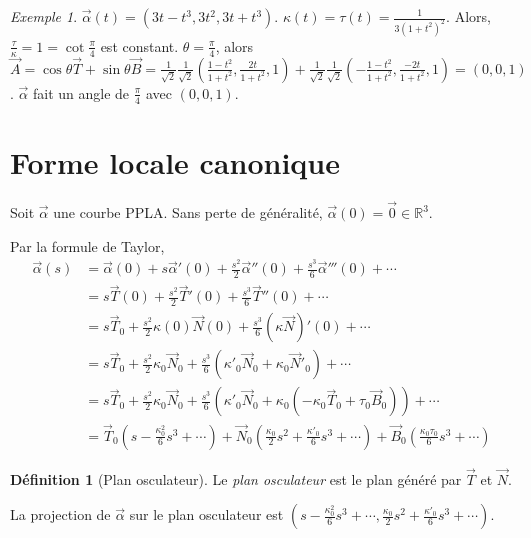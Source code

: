 \documentclass{report}
\theoremstyle{definition}
\newtheorem*{dfn}{D\'efinition}
\theoremstyle{remark}
\newtheorem*{exem}{Exemple}
\def\RR{\mathbb{R}}
\begin{document}
	\begin{exem}
		$\vec\alpha(t) = \left( 3t-t^3, 3t^2, 3t+t^3 \right)$. $\kappa(t) = \tau(t) = \frac{1}{3(1+t^2)^2}$. Alors, $\frac{\tau}{\kappa} = 1 = \cot\frac{\pi}{4}$ est constant. $\theta=\frac{\pi}{4}$, alors $\vec A=\cos\theta\vec T+\sin\theta\vec B = \frac{1}{\sqrt{2}} \frac{1}{\sqrt{2}}\left( \frac{1-t^2}{1+t^2}, \frac{2t}{1+t^2}, 1 \right) + \frac{1}{\sqrt{2}} \frac{1}{\sqrt{2}} \left( -\frac{1-t^2}{1+t^2}, \frac{-2t}{1+t^2}, 1 \right) = (0,0,1)$. $\vec\alpha$ fait un angle de $\frac{\pi}{4}$ avec $(0,0,1)$.
	\end{exem}

	\section{Forme locale canonique}
	Soit $\vec\alpha$ une courbe PPLA. Sans perte de g\'en\'eralit\'e, $\vec\alpha(0)=\vec0\in\RR^3$.

	Par la formule de Taylor,
	\begin{align*}
		\vec\alpha(s)&= \vec\alpha(0) + s\vec\alpha'(0) + \frac{s^2}{2}\vec\alpha''(0) + \frac{s^3}{6}\vec\alpha'''(0) + \cdots\\
		&= s\vec T(0) + \frac{s^2}{2}\vec T'(0) + \frac{s^3}{6}\vec T''(0) + \cdots\\
		&= s\vec T_0 + \frac{s^2}{2}\kappa(0)\vec N(0) + \frac{s^3}{6} \left(\kappa\vec N \right)'(0) + \cdots\\
		&= s\vec T_0 + \frac{s^2}{2}\kappa_0\vec N_0 + \frac{s^3}{6} \left(\kappa'_0\vec N_0 + \kappa_0\vec N'_0 \right) + \cdots\\
		&= s\vec T_0 + \frac{s^2}{2} \kappa_0\vec N_0 + \frac{s^3}{6} \left( \kappa'_0\vec N_0 + \kappa_0(-\kappa_0\vec T_0+\tau_0\vec B_0) \right) + \cdots\\
		&= \vec T_0 \left( s-\frac{\kappa_0^2}{6}s^3+\cdots \right) + \vec N_0 \left( \frac{\kappa_0}{2}s^2 + \frac{\kappa'_0}{6}s^3+\cdots \right) + \vec B_0 \left( \frac{\kappa_0\tau_0}{6}s^3+\cdots \right)
	\end{align*}

	\begin{dfn}[Plan osculateur]
		Le \emph{plan osculateur} est le plan g\'en\'er\'e par $\vec T$ et $\vec N$.

		La projection de $\vec\alpha$ sur le plan osculateur est $\left( s-\frac{\kappa_0^2}{6}s^3+\cdots, \frac{\kappa_0}{2}s^2+\frac{\kappa'_0}{6}s^3+\cdots \right)$.
	\end{dfn}
\end{document}
